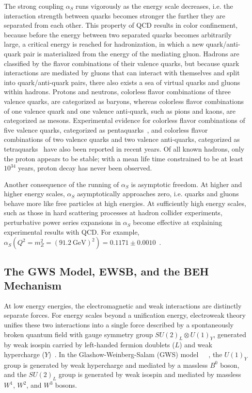The strong coupling $\alpha_S$ runs vigorously as the energy scale decreases, i.e. the interaction strength between quarks becomes stronger the further they are separated from each other.
This property of QCD results in color confinement, because before the energy between two separated quarks becomes arbitrarily large, a critical energy is reached for hadronization, in which a new quark/anti-quark pair is materialized from the energy of the mediating gluon.
Hadrons are classified by the flavor combinations of their valence quarks, but because quark interactions are mediated by gluons that can interact with themselves and split into quark/anti-quark pairs, there also exists a sea of virtual quarks and gluons within hadrons.
Protons and neutrons, colorless flavor combinations of three valence quarks, are categorized as baryons, whereas colorless flavor combinations of one valence quark and one valence anti-quark, such as pions and kaons, are categorized as mesons.
Experimental evidence for colorless flavor combinations of five valence quarks, categorized as pentaquarks~\cite{PhysRevLett.115.072001}, and colorless flavor combinations of two valence quarks and two valence anti-quarks, categorized as tetraquarks~\cite{PhysRevLett.110.252002} have also been reported in recent years.
Of all known hadrons, only the proton appears to be stable; with a mean life time constrained to be at least $10^{34}$ years, proton decay has never been observed.

Another consequence of the running of $\alpha_S$ is asymptotic freedom.
At higher and higher energy scales, $\alpha_S$ asymptotically approaches zero, i.e. quarks and gluons behave more like free particles at high energies.
At sufficiently high energy scales, such as those in hard scattering processes at hadron collider experiments, perturbative power series expansions in $\alpha_S$ become effective at explaining experimental results with QCD.
For example, $\alpha_S(Q^2 = m_Z^2 =  {(\SI{91.2}{\GeV})}^2) = 0.1171 \pm 0.0010$~\cite{PhysRevD.103.034028}.

\subsection{The GWS Model, EWSB, and the BEH Mechanism}
At low energy energies, the electromagnetic and weak interactions are distinctly separate forces.
For energy scales beyond a unification energy, electroweak theory unifies these two interactions into a single force described by a spontaneously broken quantum field with gauge symmetry group $SU(2)_L \otimes U(1)_Y$, generated by weak isospin carried by left-handed fermion doublets ($L$) and weak hypercharge ($Y$)~\cite{nagashima_2013_V2}.
In the Glashow-Weinberg-Salam (GWS) model~\cite{GLASHOW1961579}~\cite{PhysRevLett.19.1264}~\cite{doi:10.1142/9789812795915_0034}, the $U(1)_Y$ group is generated by weak hypercharge and mediated by a massless $B^0$ boson, and the $SU(2)_L$ group is generated by weak isospin and mediated by massless $W^1$, $W^2$, and $W^3$ bosons.

